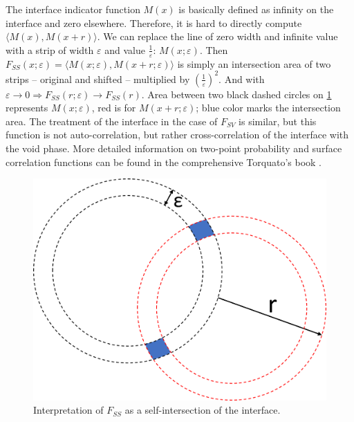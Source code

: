 \documentclass[reprint,amsmath,amssymb,aps,pre,showkeys,showpacs]{revtex4-1}
\begin{document}
The interface indicator function $M(x)$ is basically defined as infinity on the
interface and zero elsewhere. Therefore, it is hard to directly compute
$\langle M(x), M(x + r) \rangle$. We can replace the line of zero width and
infinite value with a strip of width $\varepsilon$ and value
$\frac{1}{\varepsilon}$: $M(x; \varepsilon)$. Then
$F_{SS}(x; \varepsilon) = \langle M(x; \varepsilon), M(x + r; \varepsilon) \rangle$
is simply an intersection area of two strips -- original and shifted --
multiplied by $(\frac{1}{\varepsilon})^2$.
And with $\varepsilon \to 0 \Rightarrow F_{SS}(r; \varepsilon) \to F_{SS}(r)$.
Area between two black dashed circles on \cref{fig:Fss-explained} represents
$M(x; \varepsilon)$, red is for $M(x + r; \varepsilon)$; blue color marks the
intersection area. The treatment of the interface in the case of $F_{SV}$ is
similar, but this function is not auto-correlation, but rather cross-correlation
of the interface with the void phase. More detailed information on two-point
probability and surface correlation functions can be found in the comprehensive
Torquato's book \cite{Torquato_book}.

\begin{figure}
  \centering
  \includegraphics[width=\linewidth]{images/Fss.png}
  \caption[]{Interpretation of $F_{SS}$ as a self-intersection of the interface.}
  \label{fig:Fss-explained}
\end{figure}
\end{document}
